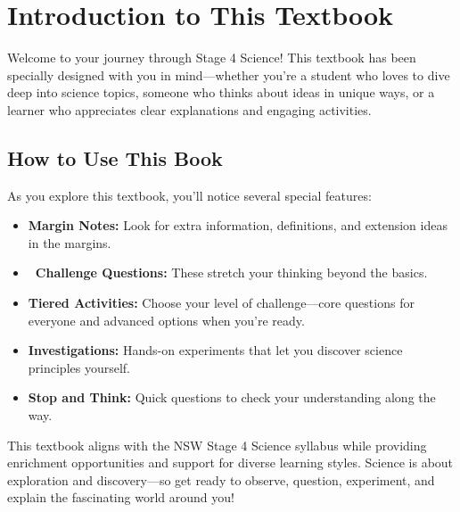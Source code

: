 \chapter*{Introduction to This Textbook}

Welcome to your journey through Stage 4 Science! This textbook has been specially designed with you in mind—whether you're a student who loves to dive deep into science topics, someone who thinks about ideas in unique ways, or a learner who appreciates clear explanations and engaging activities.

\section*{How to Use This Book}

As you explore this textbook, you'll notice several special features:

\begin{itemize}
    \item \textbf{Margin Notes:} Look for extra information, definitions, and extension ideas in the margins.
    \item \textbf{\challengeicon\ Challenge Questions:} These stretch your thinking beyond the basics.
    \item \textbf{Tiered Activities:} Choose your level of challenge—core questions for everyone and advanced options when you're ready.
    \item \textbf{Investigations:} Hands-on experiments that let you discover science principles yourself.
    \item \textbf{Stop and Think:} Quick questions to check your understanding along the way.
\end{itemize}

This textbook aligns with the NSW Stage 4 Science syllabus while providing enrichment opportunities and support for diverse learning styles. Science is about exploration and discovery—so get ready to observe, question, experiment, and explain the fascinating world around you!